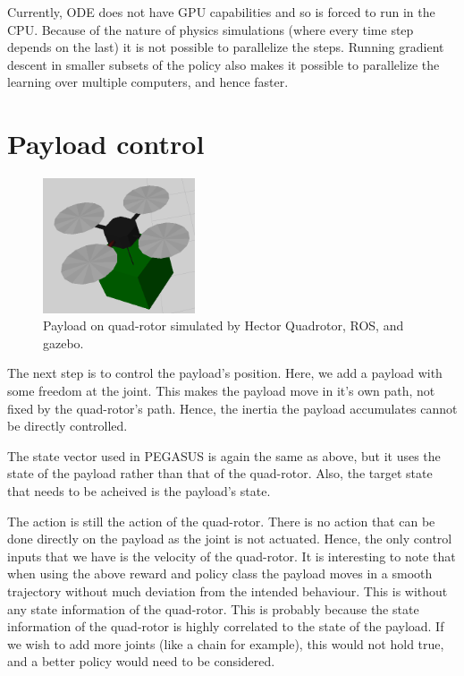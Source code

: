\documentclass[hidelinks,BTech]{iitmdiss}
\begin{document}
Currently, ODE does not have GPU capabilities and so is forced to run in the CPU. Because of the nature of physics simulations (where every time step depends on the last) it is not possible to parallelize the steps. Running gradient descent in smaller subsets of the policy also makes it possible to parallelize the learning over multiple computers, and hence faster.

\section{Payload control}

\begin{figure}[H]
  \centering
    \includegraphics[width=0.4\textwidth]{quadrotor_payload_sim.png}
    \caption{Payload on quad-rotor simulated by Hector Quadrotor, ROS, and gazebo.}
\end{figure}

The next step is to control the payload's position. Here, we add a payload with some freedom at the joint. This makes the payload move in it's own path, not fixed by the quad-rotor's path. Hence, the inertia the payload accumulates cannot be directly controlled.

The state vector used in PEGASUS is again the same as above, but it uses the state of the payload rather than that of the quad-rotor. Also, the target state that needs to be acheived is the payload's state.

The action is still the action of the quad-rotor. There is no action that can be done directly on the payload as the joint is not actuated. Hence, the only control inputs that we have is the velocity of the quad-rotor. It is interesting to note that when using the above reward and policy class the payload moves in a smooth trajectory without much deviation from the intended behaviour. This is without any state information of the quad-rotor. This is probably because the state information of the quad-rotor is highly correlated to the state of the payload. If we wish to add more joints (like a chain for example), this would not hold true, and a better policy would need to be considered.
\end{document}
